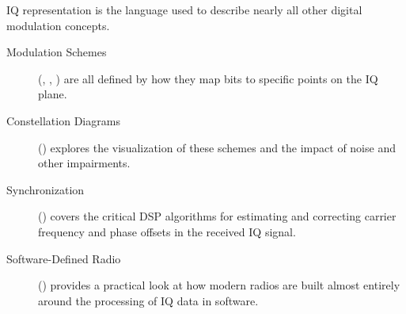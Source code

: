\begin{importantbox}[title={Further Reading}]
    IQ representation is the language used to describe nearly all other digital modulation concepts.
    \begin{description}
        \item[Modulation Schemes] (, , ) are all defined by how they map bits to specific points on the IQ plane.
        \item[Constellation Diagrams] () explores the visualization of these schemes and the impact of noise and other impairments.
        \item[Synchronization] () covers the critical DSP algorithms for estimating and correcting carrier frequency and phase offsets in the received IQ signal.
        \item[Software-Defined Radio] () provides a practical look at how modern radios are built almost entirely around the processing of IQ data in software.
    \end{description}
\end{importantbox}
